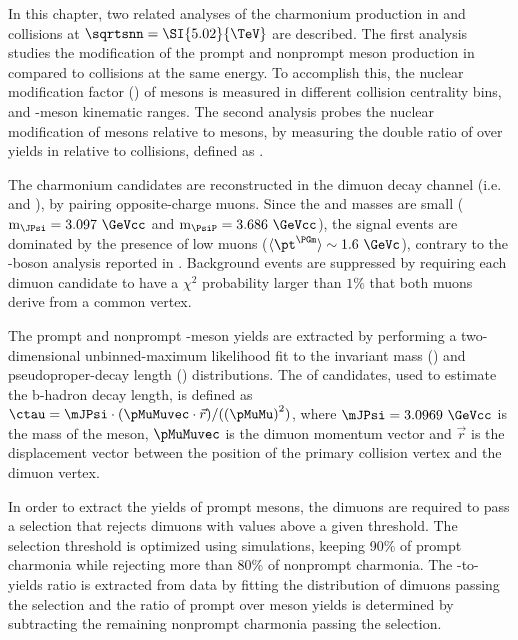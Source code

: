 In this chapter, two related analyses of the charmonium production in \Runpp and \RunPbPb collisions at $\sqrtsnn = \SI{5.02}{\TeV}$ are described. The first analysis studies the modification of the prompt and nonprompt \JPsi meson production in \RunPbPb compared to \Runpp collisions at the same energy. To accomplish this, the nuclear modification factor (\raa) of \JPsi mesons is measured in different collision centrality bins, and \JPsi-meson kinematic ranges. The second analysis probes the nuclear modification of \PsiP mesons relative to \JPsi mesons, by measuring the double ratio of \PsiP over \JPsi yields in \RunPbPb relative to \Runpp collisions, defined as \doubleRatio.

The charmonium candidates are reconstructed in the dimuon decay channel (i.e. \JPsiToMuMu and \PsiPToMuMu), by pairing opposite-charge muons. Since the \JPsi and \PsiP masses are small ($\text{m}_{\JPsi} = 3.097~\GeVcc$ and $\text{m}_{\PsiP} = 3.686~\GeVcc$), the signal events are dominated by the presence of low \pt muons ($\langle\pt^{\PGm}\rangle \sim 1.6~\GeVc$), contrary to the \PW-boson analysis reported in . Background events are suppressed by requiring each dimuon candidate to have a $\chi^2$ probability larger than $1\%$ that both muons derive from a common vertex.

The prompt and nonprompt \JPsi-meson yields are extracted by performing a two-dimensional unbinned-maximum likelihood fit to the \mumu invariant mass (\mMuMu) and pseudoproper-decay length (\ctau) distributions. The \ctau of \mumu candidates, used to estimate the b-hadron decay length, is defined as $\ctau = \mJPsi\cdot({\pMuMuvec \cdot \vec{r}})/({\left(\pMuMu\right)^{2}})$, where $\mJPsi = 3.0969~\GeVcc$ is the mass of the \JPsi meson, $\pMuMuvec$ is the dimuon momentum vector and $\vec{r}$ is the displacement vector between the position of the primary collision vertex and the dimuon vertex.

In order to extract the yields of prompt \PsiP mesons, the dimuons are required to pass a \ctau selection that rejects dimuons with \ctau values above a given threshold. The \ctau selection threshold is optimized using simulations, keeping 90\% of prompt charmonia while rejecting more than 80\% of nonprompt charmonia. The \PsiP-to-\JPsi yields ratio is extracted from data by fitting the \mMuMu distribution of dimuons passing the \ctau selection and the ratio of prompt \PsiP over \JPsi meson yields is determined by subtracting the remaining nonprompt charmonia passing the \ctau selection.

